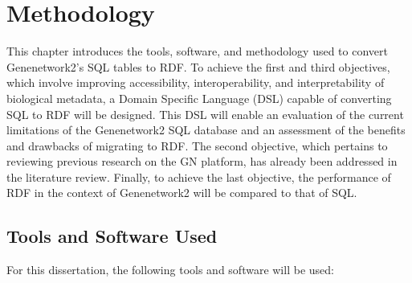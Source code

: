 \chapter{Methodology}

This chapter introduces the tools, software, and methodology used to convert Genenetwork2's SQL tables to RDF.  To achieve the first and third objectives, which involve improving accessibility, interoperability, and interpretability of biological metadata, a Domain Specific Language (DSL) capable of converting SQL to RDF will be designed.  This DSL will enable an evaluation of the current limitations of the Genenetwork2 SQL database and an assessment of the benefits and drawbacks of migrating to RDF.  The second objective, which pertains to reviewing previous research on the GN platform, has already been addressed in the literature review.  Finally, to achieve the last objective, the performance of RDF in the context of Genenetwork2 will be compared to that of SQL.

\section{Tools and Software Used}

For this dissertation, the following tools and software will be used:

